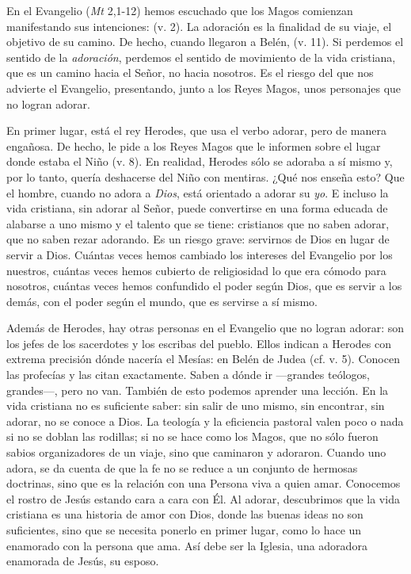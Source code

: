 				\begin{body}
					En el Evangelio (\emph{Mt} 2,1-12) hemos escuchado que los Magos comienzan manifestando sus intenciones:  (v. 2). La adoración es la finalidad de su viaje, el objetivo de su camino. De hecho, cuando llegaron a Belén,  (v. 11). Si perdemos el sentido de la \emph{adoración}, perdemos el sentido de movimiento de la vida cristiana, que es un camino hacia el Señor, no hacia nosotros. Es el riesgo del que nos advierte el Evangelio, presentando, junto a los Reyes Magos, unos personajes que no logran adorar.
					
					En primer lugar, está el rey Herodes, que usa el verbo adorar, pero de manera engañosa. De hecho, le pide a los Reyes Magos que le informen sobre el lugar donde estaba el Niño  (v. 8). En realidad, Herodes sólo se adoraba a sí mismo y, por lo tanto, quería deshacerse del Niño con mentiras. ¿Qué nos enseña esto? Que el hombre, cuando no adora a \emph{Dios}, está orientado a adorar su \emph{yo}. E incluso la vida cristiana, sin adorar al Señor, puede convertirse en una forma educada de alabarse a uno mismo y el talento que se tiene: cristianos que no saben adorar, que no saben rezar adorando. Es un riesgo grave: servirnos de Dios en lugar de servir a Dios. Cuántas veces hemos cambiado los intereses del Evangelio por los nuestros, cuántas veces hemos cubierto de religiosidad lo que era cómodo para nosotros, cuántas veces hemos confundido el poder según Dios, que es servir a los demás, con el poder según el mundo, que es servirse a sí mismo.
					
					Además de Herodes, hay otras personas en el Evangelio que no logran adorar: son los jefes de los sacerdotes y los escribas del pueblo. Ellos indican a Herodes con extrema precisión dónde nacería el Mesías: en Belén de Judea (cf. v. 5). Conocen las profecías y las citan exactamente. Saben a dónde ir ---grandes teólogos, grandes---, pero no van. También de esto podemos aprender una lección. En la vida cristiana no es suficiente saber: sin salir de uno mismo, sin encontrar, sin adorar, no se conoce a Dios. La teología y la eficiencia pastoral valen poco o nada si no se doblan las rodillas; si no se hace como los Magos, que no sólo fueron sabios organizadores de un viaje, sino que caminaron y adoraron. Cuando uno adora, se da cuenta de que la fe no se reduce a un conjunto de hermosas doctrinas, sino que es la relación con una Persona viva a quien amar. Conocemos el rostro de Jesús estando cara a cara con Él. Al adorar, descubrimos que la vida cristiana es una historia de amor con Dios, donde las buenas ideas no son suficientes, sino que se necesita ponerlo en primer lugar, como lo hace un enamorado con la persona que ama. Así debe ser la Iglesia, una adoradora enamorada de Jesús, su esposo.
					

\end{body}
